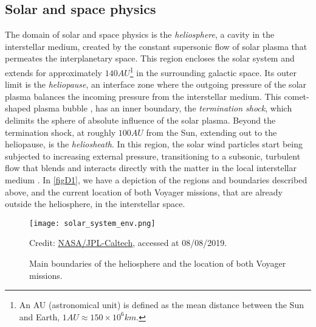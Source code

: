 \documentclass[12pt,a4paper,ruledheader]{report}
\begin{document}
\begin{appendix}
\section{Solar and space physics}
\label{sec:solar-physics}
The domain of solar and space physics is the \emph{heliosphere}, a cavity in
the interstellar medium, created by the constant supersonic flow of solar
plasma that permeates the interplanetary space. This region encloses the
solar system and extends for approximately $140\unit{AU}$\footnote{An AU
  (astronomical unit) is defined as the mean distance between the Sun and
  Earth, $1\unit{AU}\approx 150\times 10^6\unit{km}$.} in the surrounding
galactic space. Its outer limit is the \emph{heliopause}, an interface zone
where the outgoing pressure of the solar plasma balances the incoming pressure
from the interstellar medium. This comet-shaped plasma bubble \cite{Dialynas2017},
has an inner boundary, the \emph{termination shock}, which delimits the sphere
of absolute influence of the solar plasma. Beyond the termination shock, at
roughly $100\unit{AU}$ from the Sun, extending out to the heliopause, is the
\emph{heliosheath}. In this region, the solar wind particles start being subjected
to increasing external pressure, transitioning to a subsonic, turbulent flow that
blends and interacts directly with the matter in the local interstellar medium
\cite{NAP13060}. In \autoref{figD1}, we have a depiction of the regions and
boundaries described above, and the current location of both Voyager missions,
that are already outside the heliosphere, in the interstellar space.
\begin{figure}[h]
  \begin{center}
    \texttt{[image: solar\_system\_env.png]}
    \caption{Main boundaries of the heliosphere and the location of both
      Voyager missions.}
      {\footnotesize Credit:}
      \href{https://voyager.jpl.nasa.gov/news/details.php?article_id=112}
      {\footnotesize NASA/JPL-Caltech}{\footnotesize , accessed at 08/08/2019.}
    \label{figD1}
  \end{center}
\end{figure}



\end{appendix}
\end{document}
